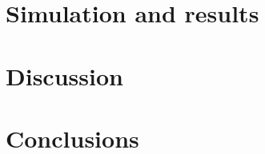 \documentclass[useAMS,usenatbib]{mn2e}
\begin{document}
\section{Simulation and results}
\section{Discussion}
\section{Conclusions}
\end{document}
